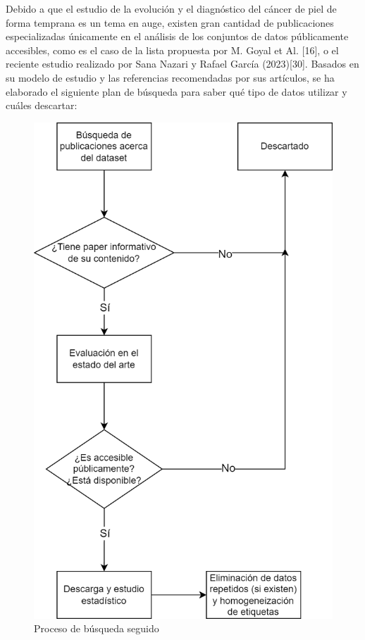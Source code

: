 Debido a que el estudio de la evolución y el diagnóstico del cáncer de piel de forma temprana es un tema en auge, existen gran cantidad de publicaciones especializadas únicamente en el análisis de los conjuntos de datos públicamente accesibles, como es el caso de la lista propuesta por M. Goyal et Al. [16], o el reciente estudio realizado por Sana Nazari y Rafael García (2023)[30].
Basados en su modelo de estudio y las referencias recomendadas por sus artículos, se ha elaborado el siguiente plan de búsqueda para saber qué tipo de datos utilizar y cuáles descartar:

\begin{figure}[H]
	\centering
	\includegraphics[scale=0.75]{imagenes/DiagramaBusqueda.png}
	\caption{Proceso de búsqueda seguido}
\end{figure}

